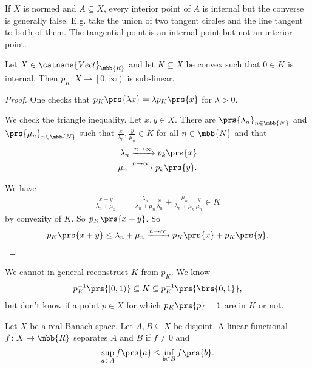 \documentclass[10pt, twoside]{book}
\begin{document}
\begin{remark}
If $X$ is normed and $A \subseteq X$, every interior point of $A$ is internal but the converse is generally false. E.g. take the union of two tangent circles and the line tangent to both of them. The tangential point is an internal point but not an interior point.
\end{remark}

\begin{fact}
Let $X \in \catname{Vect}_{\mbb{R}}$ and let $K \subseteq X$ be convex such that $0 \in K$ is internal. Then $p_K \colon X \to \left[0, \infty \right)$ is sub-linear.
\end{fact}

\begin{proof}
One checks that $p_K\prs{\lambda x} = \lambda p_K\prs{x}$ for $\lambda > 0$.

We check the triangle inequality.
Let $x,y \in X$. There are $\prs{\lambda_n}_{n \in \mbb{N}}$ and $\prs{\mu_n}_{n \in \mbb{N}}$ such that $\frac{x}{\lambda_n}, \frac{y}{\mu_n} \in K$ for all $n \in \mbb{N}$ and that
\begin{align*}
\lambda_n \xrightarrow{n\to\infty} p_k\prs{x} \\
\mu_n \xrightarrow{n\to\infty} p_k\prs{y} \text{.}
\end{align*}

We have
\begin{align*}
\frac{x+y}{\lambda_n + \mu_n} &=
\frac{\lambda_n}{\lambda_n + \mu_n} \frac{x}{\lambda_n} + \frac{\mu_n}{\lambda_n + \mu_n} \frac{y}{\mu_n} \in K
\end{align*}
by convexity of $K$. So $p_K\prs{x+y}$.
So \[p_K\prs{x+y} \leq \lambda_n + \mu_n \xrightarrow{n\to\infty} p_K\prs{x} + p_K\prs{y}\text{.}\]
\end{proof}

\begin{remark}
We cannot in general reconstruct $K$ from $p_K$. We know
\begin{align*}
p_K^{-1}\prs{\left[0,1\right)} \subseteq K \subseteq p_K^{-1}\prs{\brs{0,1}} \text{,}
\end{align*}
but don't know if a point $p \in X$ for which $p_K\prs{p} = 1$ are in $K$ or not.
\end{remark}

\begin{definition}
Let $X$ be a real Banach space.
Let $A,B \subseteq X$ be disjoint. A linear functional $f \colon X \to \mbb{R}$ separates $A$ and $B$ if $f \neq 0$ and
\[\sup_{a \in A} f\prs{a} \leq \inf_{b \in B} f\prs{b} \text{.}\]
\end{definition}
\end{document}
